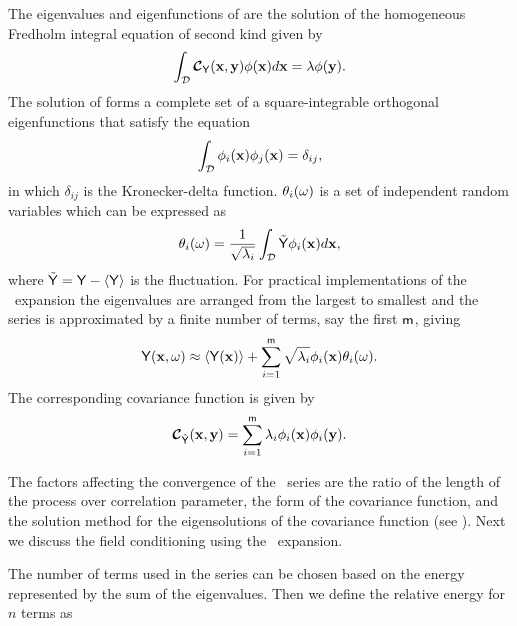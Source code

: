 The eigenvalues and eigenfunctions of  are the solution of the homogeneous Fredholm integral equation of second kind given by
%
\begin{equation}
  \int_{\mathcal{D}} {\boldmath{\mbox{$\mathcal{C}$}}}_{\mathsf{Y}}(\mathbf{x}, \mathbf{y}) \phi(\mathbf{x}) d\mathbf{x} = \lambda\phi(\mathbf{y}).
\label{fred}
\end{equation}
%
\noindent The solution of  forms a complete set of a square-integrable
orthogonal eigenfunctions that satisfy the equation
%
\begin{equation*}
  \int_{\mathcal{D}} \phi_{i}(\mathbf{x}) \phi_{j}(\mathbf{x})=\delta_{ij},
\label{ortho}
\end{equation*}
%
\noindent in which $\delta_{ij}$ is the Kronecker-delta function.
$\theta_{i}(\omega)$ is a set of independent random variables which
can be expressed as
%
\begin{equation*}
  \theta_{i}(\omega) = \displaystyle
\frac{1}{\sqrt{\lambda_{i}}}\int_{\mathcal{D}}\tilde{\mathsf{Y}}\phi_{i}(\mathbf{x}) d\mathbf{x},
\end{equation*}
%
\noindent where $\tilde{\mathsf{Y}}=\mathsf{Y}-\langle {\mathsf{Y}} \rangle$ is the fluctuation.
For practical implementations of the \kl\ expansion the eigenvalues are arranged from the largest to smallest and the series is approximated by a finite number of terms, say the first $\mathsf{m}$, giving
%
\begin{equation}
  \mathsf{Y}\!\left(\mathbf{x},\omega\right) \approx \langle {\mathsf{Y}(\mathbf{x})} \rangle +\sum_{i=1}^{\mathsf{m}}\sqrt{\lambda_{i}} \phi_{i}(\mathbf{x})
\theta_{i}(\omega).
\label{klM}
\end{equation}
%
The corresponding covariance function is given by
%
\begin{equation*}
  {\boldmath{\mbox{$\mathcal{C}$}}}_{\hat{\mathsf{Y}}}(\mathbf{x}, \mathbf{y}) = \sum_{i=1}^{\mathsf{m}} \lambda_{i}\phi_{i}(\mathbf{x})\phi_{i}(\mathbf{y}).
\label{klcovM}
\end{equation*}
%

The factors affecting the convergence of the \KL\ series are the ratio of the length of the process over correlation parameter, the form of the covariance function, and the solution method for the eigensolutions of the covariance function (see \cite{huang01}).
Next we discuss the field conditioning using the \kl\ expansion.

The number of terms used in the series can be chosen based on the energy represented by the sum of the eigenvalues.
Then we define the relative energy for $n$ terms as

